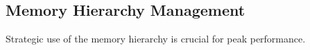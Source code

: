 \subsection{Memory Hierarchy Management}

Strategic use of the memory hierarchy is crucial for peak performance.

